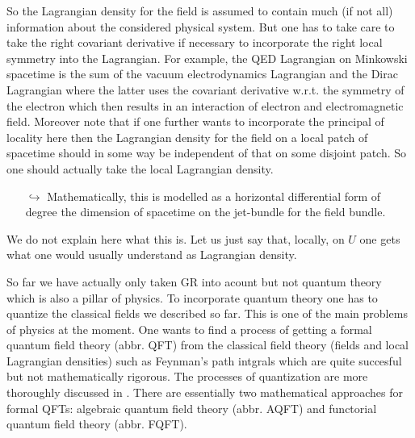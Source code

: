 \begin{enumerate}
\begin{enumerate}
\end{enumerate}
So the Lagrangian density for the field is assumed to contain much (if not all) information about the considered physical system. But one has to take care to take the right covariant derivative if necessary to incorporate the right local symmetry into the Lagrangian. For example, the QED Lagrangian on Minkowski spacetime is the sum of the vacuum electrodynamics Lagrangian and the Dirac Lagrangian where the latter uses the covariant derivative w.r.t. the symmetry of the electron which then results in an interaction of electron and electromagnetic field. Moreover note that if one further wants to incorporate the principal of locality here then the Lagrangian density for the field on a local patch of spacetime should in some way be independent of that on some disjoint patch. So one should actually take the local Lagrangian density.
\begin{enumerate}
\item[$\pmb{\hookrightarrow}$]
Mathematically, this is modelled as a horizontal differential form of degree the dimension of spacetime on the jet-bundle for the field bundle.
\end{enumerate}
We do not explain here what this is. Let us just say that, locally, on $U$ one gets what one would usually understand as Lagrangian density.
\end{enumerate}
So far we have actually only taken GR into acount but not quantum theory which is also a pillar of physics. To incorporate quantum theory one has to quantize the classical fields we described so far. This is one of the main problems of physics at the moment. One wants to find a process of getting a formal quantum field theory (abbr. QFT) from the classical field theory (fields and local Lagrangian densities) such as Feynman's path intgrals which are quite succesful but not mathematically rigorous. The processes of quantization are more thoroughly discussed in \cite{00000011}. There are essentially two mathematical approaches for formal QFTs: algebraic quantum field theory (abbr. AQFT) and functorial quantum field theory (abbr. FQFT).
